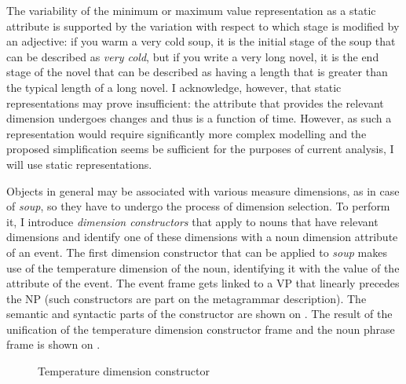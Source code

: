 The variability of the minimum or maximum value representation as a static attribute is supported by the variation with respect to which stage is modified by an adjective: if you warm a very cold soup, it is the initial stage of the soup that can be described as \textit{very cold}, but if you write a very long novel, it is the end stage of the novel that can be described as having a length that is greater than the typical length of a long novel. I acknowledge, however, that static representations may prove insufficient: the attribute that provides the relevant dimension undergoes changes and thus is a function of time. However, as such a representation would require significantly more complex modelling and the proposed simplification seems be sufficient for the purposes of current analysis, I will use static representations.

Objects in general may be associated with various measure dimensions, as in case of \textit{soup}, so they have to undergo the process of dimension selection. To perform it, I introduce \textit{dimension constructors} that apply to nouns that have relevant dimensions and identify one of these dimensions with a noun dimension attribute of an event. The first dimension constructor that can be applied to \textit{soup} makes use of the temperature dimension of the noun, identifying it with the value of the attribute \NOUNDIM of the event. The event frame gets linked to a VP that linearly precedes the NP (such constructors are part on the metagrammar description). The semantic and syntactic parts of the constructor are shown on . The result of the unification of the temperature dimension constructor frame and the noun phrase frame is shown on .

\begin{figure}
\begin{minipage}{0.6\textwidth}
\end{minipage}
\begin{minipage}{0.35\textwidth}
\end{minipage}
\caption{Temperature dimension constructor\label{constructor:temp}}
\end{figure}


